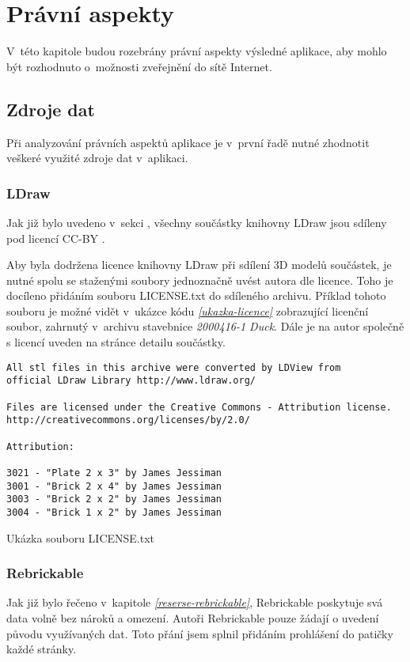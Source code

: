 \chapter{Právní aspekty} 
V~této kapitole budou rozebrány právní aspekty výsledné aplikace, aby mohlo být rozhodnuto o~možnosti zveřejnění do sítě Internet. 

\section{Zdroje dat}
Při analyzování právních aspektů aplikace je v~první řadě nutné zhodnotit veškeré využité zdroje dat v~aplikaci. 

\subsection{LDraw}
Jak již bylo uvedeno v~sekci \autocite{reserse-ldraw}, všechny součástky knihovny LDraw jsou sdíleny pod licencí \gls{CC-BY} \autocite{CC-BY}.

Aby byla dodržena licence knihovny LDraw při sdílení 3D modelů součástek, je nutné spolu se staženými soubory jednoznačně uvést autora dle licence. Toho je docíleno přidáním souboru LICENSE.txt do sdíleného archivu. Příklad tohoto souboru je možné vidět v~ukázce kódu \emph{\ref{ukazka-licence}} zobrazující licenční soubor, zahrnutý v~archivu stavebnice \textit{2000416-1 Duck}. Dále je na autor společně s licencí uveden na stránce detailu součástky.

\begin{listing}[htbp]
        \begin{verbatim}
All stl files in this archive were converted by LDView from 
official LDraw Library http://www.ldraw.org/

Files are licensed under the Creative Commons - Attribution license.
http://creativecommons.org/licenses/by/2.0/

Attribution:

3021 - "Plate 2 x 3" by James Jessiman
3001 - "Brick 2 x 4" by James Jessiman
3003 - "Brick 2 x 2" by James Jessiman
3004 - "Brick 1 x 2" by James Jessiman
        \end{verbatim}
    \caption{Ukázka souboru LICENSE.txt\label{ukazka-licence}}
\end{listing}

\subsection{Rebrickable}
Jak již bylo řečeno v~kapitole \emph{\ref{reserse-rebrickable}}, Rebrickable poskytuje svá data volně bez nároků a omezení. Autoři Rebrickable pouze žádají o uvedení původu využívaných dat. Toto přání jsem splnil přidáním prohlášení do patičky každé stránky.

